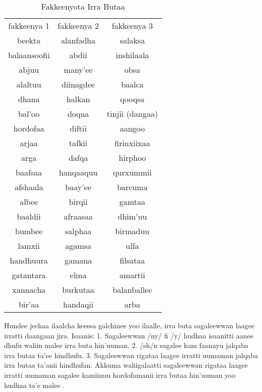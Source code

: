 \documentclass[11pt,b5paper]{book}
\begin{document}
\begin{table}[H]
\caption{Fakkeenyota Irra Butaa}
\centering
\begin{tabular} {c c c} \\
  \hline\hline
  fakkeenya 1 & fakkeenya 2 & fakkeenya 3 \\
  beekta & alanfadha & salaksa \\
  balaansoofii & abdii & inshilaala \\
  abjuu & many'ee & obsa \\
  alaltuu & diinagdee & baalca \\
  dhana & halkan & qooqsa \\
  bal'oo & doqna & tinjii (dangaa)\\
  hordofaa & diftii & aangoo \\
  arjaa & tafkii & firinxiixaa \\
  arga & dafqa & hirphoo \\
  baafsaa & hanqaaquu & qurxummii \\
  afshaala & baay'ee & barcuma \\
  albee & birqii & gamtaa \\
  baaldii & afraasaa & dhim'uu \\
  bumbee & salphaa & birmaduu \\
  lamxii & agamsa & ulfa \\
  handhuura & gamana & filsataa \\
  gatantara & elma & amartii \\
  xannacha & burkutaa & balanballee \\
  bir'aa & handaqii & arba \\
\hline\hline
\end{tabular}
\end{table}

Hundee jechaa ilaalcha keessa galchinee yoo ilaalle, irra buta sagaleewwan laagee irratti daangaan jira. Isaanis: 1. Sagaleewwan /ny/ fi /y/ hudhaa isaanitti aanee dhufu waliin malee irra buta hin’uuman. 2. /sh/n sagalee kam faanayu jalqaba irra butaa ta’ee hindhufu. 3. Sagaleewwan rigataa laagee irratti uumaman jalqaba irra butaa ta’anii hindhufan. Akkuma waliigalaatti sagaleewwan rigataa laagee irratti uumaman sagalee kamiinuu hordofamanii irra butaa hin’uuman yoo hudhaa ta’e malee \cite[p.20]{lloret1988gemination}.
\end{document}
